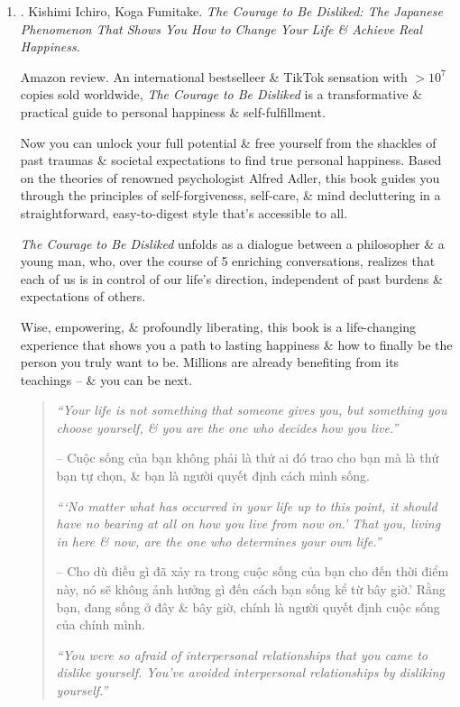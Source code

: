 \documentclass{article}
\begin{document}
\begin{enumerate}
	\item \cite{Ichiro_Fumitake_disliked}. {\sc Kishimi Ichiro, Koga Fumitake}. {\it The Courage to Be Disliked: The Japanese Phenomenon That Shows You How to Change Your Life \& Achieve Real Happiness}. {}

	{\sf Amazon review.} An international bestselleer \& TikTok sensation with $> 10^7$ copies sold worldwide, {\it The Courage to Be  Disliked} is a transformative \& practical guide to personal happiness \& self-fulfillment.

	Now you can unlock your full potential \& free yourself from the shackles of past traumas \& societal expectations to find true personal happiness. Based on the theories of renowned psychologist {\sc Alfred Adler}, this book guides you through the principles of self-forgiveness, self-care, \& mind decluttering in a straightforward, easy-to-digest style that's accessible to all.

	{\it The Courage to Be Disliked} unfolds as a dialogue between a philosopher \& a young man, who, over the course of 5 enriching conversations, realizes that each of us is in control of our life's direction, independent of past burdens \& expectations of others.

	Wise, empowering, \& profoundly liberating, this book is a life-changing experience that shows you a path to lasting happiness \& how to finally be the person you truly want to be. Millions are already benefiting from its teachings -- \& you can be next.
	\begin{quotation}
		{\it``Your life is not something that someone gives you, but something you choose yourself, \& you are the one who decides how you live.''}

		-- Cuộc sống của bạn không phải là thứ ai đó trao cho bạn mà là thứ bạn tự chọn, \& bạn là người quyết định cách mình sống.

		{\it```No matter what has occurred in your life up to this point, it should have no bearing at all on how you live from now on.' That you, living in here \& now, are the one who determines your own life.''}

		-- Cho dù điều gì đã xảy ra trong cuộc sống của bạn cho đến thời điểm này, nó sẽ không ảnh hưởng gì đến cách bạn sống kể từ bây giờ.' Rằng bạn, đang sống ở đây \& bây giờ, chính là người quyết định cuộc sống của chính mình.

		{\it``You were so afraid of interpersonal relationships that you came to dislike yourself. You've avoided interpersonal relationships by disliking yourself.''}


\end{quotation}
\end{enumerate}
\end{document}
